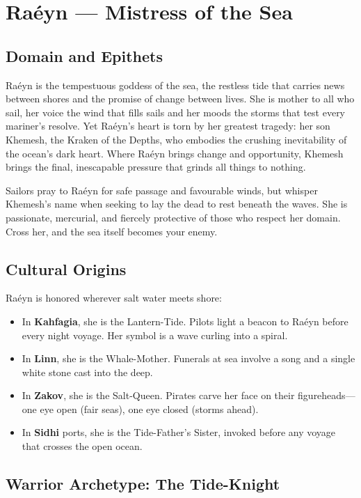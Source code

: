 \section{Raéyn — Mistress of the Sea}

\subsection{Domain and Epithets}

Raéyn is the tempestuous goddess of the sea, the restless tide that carries news between shores and the promise of change between lives. She is mother to all who sail, her voice the wind that fills sails and her moods the storms that test every mariner's resolve. Yet Raéyn's heart is torn by her greatest tragedy: her son Khemesh, the Kraken of the Depths, who embodies the crushing inevitability of the ocean's dark heart. Where Raéyn brings change and opportunity, Khemesh brings the final, inescapable pressure that grinds all things to nothing.

Sailors pray to Raéyn for safe passage and favourable winds, but whisper Khemesh's name when seeking to lay the dead to rest beneath the waves. She is passionate, mercurial, and fiercely protective of those who respect her domain. Cross her, and the sea itself becomes your enemy.

\subsection{Cultural Origins}

Raéyn is honored wherever salt water meets shore:

\begin{itemize}
\item In \textbf{Kahfagia}, she is the Lantern-Tide. Pilots light a beacon to Raéyn before every night voyage. Her symbol is a wave curling into a spiral.
\item In \textbf{Linn}, she is the Whale-Mother. Funerals at sea involve a song and a single white stone cast into the deep.
\item In \textbf{Zakov}, she is the Salt-Queen. Pirates carve her face on their figureheads—one eye open (fair seas), one eye closed (storms ahead).
\item In \textbf{Sidhi} ports, she is the Tide-Father's Sister, invoked before any voyage that crosses the open ocean.
\end{itemize}

\subsection{Warrior Archetype: The Tide-Knight}

